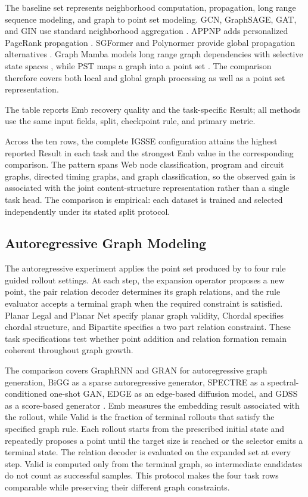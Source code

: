 The baseline set represents neighborhood computation, propagation, long range
sequence modeling, and graph to point set modeling.  GCN, GraphSAGE, GAT, and
GIN use standard neighborhood aggregation
\cite{kipf2017,hamilton2017,velickovic2018,xu2019}.  APPNP adds personalized
PageRank propagation \cite{gasteiger2019}.  SGFormer and Polynormer provide
global propagation alternatives \cite{wu2023sgformer,deng2024polynormer}.
Graph Mamba models long range graph dependencies with selective state spaces
\cite{wang2024graphmamba}, while PST maps a graph into a point set
\cite{wang2024graphpointset}.  The comparison therefore covers both local and
global graph processing as well as a point set representation.

The table reports Emb recovery quality and the task-specific Result; all methods
use the same input fields, split, checkpoint rule, and primary metric.

Across the ten rows, the complete IGSSE configuration attains the highest
reported Result in each task and the strongest Emb value in the corresponding
comparison.  The pattern spans Web node classification, program and circuit
graphs, directed timing graphs, and graph classification, so the observed gain
is associated with the joint content-structure representation rather than a
single task head.  The comparison is empirical: each dataset is trained and
selected independently under its stated split protocol.

\subsection{Autoregressive Graph Modeling}
\label{sec:ar-results}

The autoregressive experiment applies the point set produced by \method{} to
four rule guided rollout settings.  At each step, the expansion operator
proposes a new point, the pair relation decoder determines its graph relations,
and the rule evaluator accepts a terminal graph when the required constraint is
satisfied.  Planar Legal and Planar Net specify planar graph validity, Chordal
specifies chordal structure, and Bipartite specifies a two part relation
constraint.  These task specifications test whether point addition and relation
formation remain coherent throughout graph growth.

The comparison covers GraphRNN and GRAN for autoregressive graph generation,
BiGG as a sparse autoregressive generator, SPECTRE as a spectral-conditioned
one-shot GAN, EDGE as an edge-based diffusion model, and GDSS as a score-based
generator
\cite{you2018,liao2019,dai2020,martinkus2022spectre,chen2023edge,jo2022}.
Emb measures the
embedding result associated with the rollout, while Valid is the fraction of
terminal rollouts that satisfy the specified graph rule.
Each rollout starts from the prescribed initial state and repeatedly proposes a
point until the target size is reached or the selector emits a terminal state.
The relation decoder is evaluated on the expanded set at every step.  Valid is
computed only from the terminal graph, so intermediate candidates do not count
as successful samples.  This protocol makes the four task rows comparable
while preserving their different graph constraints.

